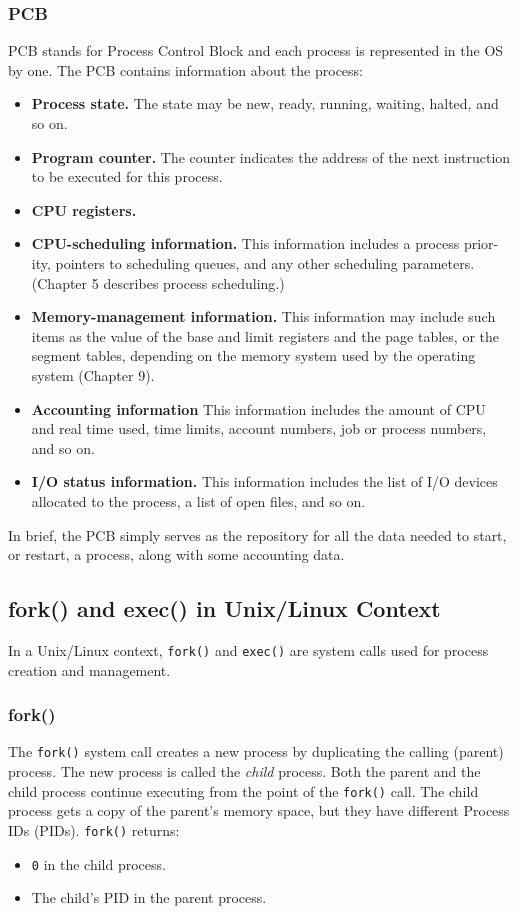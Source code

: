 \documentclass{article}
\begin{document}
\subsubsection{PCB}
PCB stands for Process Control Block and each process is represented in the OS by one. The PCB contains information about the process:
\begin{itemize}
    \item {\bf Process state.} The state may be new, ready, running, waiting, halted, and
    so on.
    \item {\bf Program counter.} The counter indicates the address of the next instruction
    to be executed for this process.
    \item {\bf CPU registers.}
    \item {\bf CPU-scheduling information.} This information includes a process prior-
    ity, pointers to scheduling queues, and any other scheduling parameters.
    (Chapter 5 describes process scheduling.)
    \item {\bf Memory-management information.} This information may include such
    items as the value of the base and limit registers and the page tables, or the
    segment tables, depending on the memory system used by the operating
    system (Chapter 9).
    \item {\bf Accounting information} This information includes the amount of CPU
    and real time used, time limits, account numbers, job or process numbers,
    and so on.
    \item {\bf I/O status information.} This information includes the list of I/O devices
    allocated to the process, a list of open files, and so on.
\end{itemize}
In brief, the PCB simply serves as the repository for all the data needed to start,
or restart, a process, along with some accounting data.

\subsection*{fork() and exec() in Unix/Linux Context}

In a Unix/Linux context, \texttt{fork()} and \texttt{exec()} are system calls used for process creation and management.

\subsubsection*{fork()}
The \texttt{fork()} system call creates a new process by duplicating the calling (parent) process. The new process is called the \textit{child} process. Both the parent and the child process continue executing from the point of the \texttt{fork()} call. The child process gets a copy of the parent’s memory space, but they have different Process IDs (PIDs). \texttt{fork()} returns:
\begin{itemize}
    \item \texttt{0} in the child process.
    \item The child’s PID in the parent process.
\end{itemize}
\end{document}
